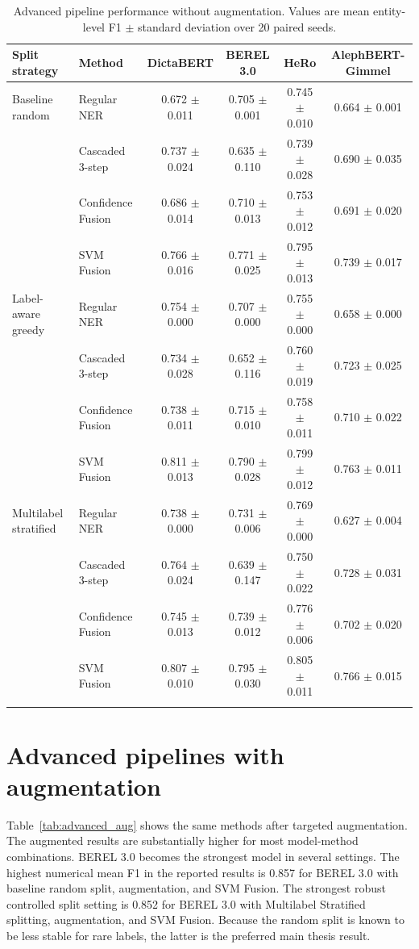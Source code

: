 \documentclass[12pt,a4paper]{report}
\begin{document}
\begin{landscape}
\begin{table}[htbp]
\centering
\scriptsize
\caption{Advanced pipeline performance without augmentation. Values are mean entity-level F1 $\pm$ standard deviation over 20 paired seeds.}
\label{tab:advanced_nonaug}
\begin{tabular}{llcccc}
\toprule
Split strategy & Method & DictaBERT & BEREL 3.0 & HeRo & AlephBERT-Gimmel \\
\midrule
Baseline random & Regular NER & 0.672 $\pm$ 0.011 & 0.705 $\pm$ 0.001 & 0.745 $\pm$ 0.010 & 0.664 $\pm$ 0.001 \\
 & Cascaded 3-step & 0.737 $\pm$ 0.024 & 0.635 $\pm$ 0.110 & 0.739 $\pm$ 0.028 & 0.690 $\pm$ 0.035 \\
 & Confidence Fusion & 0.686 $\pm$ 0.014 & 0.710 $\pm$ 0.013 & 0.753 $\pm$ 0.012 & 0.691 $\pm$ 0.020 \\
 & SVM Fusion & 0.766 $\pm$ 0.016 & 0.771 $\pm$ 0.025 & 0.795 $\pm$ 0.013 & 0.739 $\pm$ 0.017 \\
\addlinespace[2pt]
Label-aware greedy & Regular NER & 0.754 $\pm$ 0.000 & 0.707 $\pm$ 0.000 & 0.755 $\pm$ 0.000 & 0.658 $\pm$ 0.000 \\
 & Cascaded 3-step & 0.734 $\pm$ 0.028 & 0.652 $\pm$ 0.116 & 0.760 $\pm$ 0.019 & 0.723 $\pm$ 0.025 \\
 & Confidence Fusion & 0.738 $\pm$ 0.011 & 0.715 $\pm$ 0.010 & 0.758 $\pm$ 0.011 & 0.710 $\pm$ 0.022 \\
 & SVM Fusion & 0.811 $\pm$ 0.013 & 0.790 $\pm$ 0.028 & 0.799 $\pm$ 0.012 & 0.763 $\pm$ 0.011 \\
\addlinespace[2pt]
Multilabel stratified & Regular NER & 0.738 $\pm$ 0.000 & 0.731 $\pm$ 0.006 & 0.769 $\pm$ 0.000 & 0.627 $\pm$ 0.004 \\
 & Cascaded 3-step & 0.764 $\pm$ 0.024 & 0.639 $\pm$ 0.147 & 0.750 $\pm$ 0.022 & 0.728 $\pm$ 0.031 \\
 & Confidence Fusion & 0.745 $\pm$ 0.013 & 0.739 $\pm$ 0.012 & 0.776 $\pm$ 0.006 & 0.702 $\pm$ 0.020 \\
 & SVM Fusion & 0.807 $\pm$ 0.010 & 0.795 $\pm$ 0.030 & 0.805 $\pm$ 0.011 & 0.766 $\pm$ 0.015 \\
\addlinespace[2pt]
\bottomrule
\end{tabular}
\end{table}
\end{landscape}

\section{Advanced pipelines with augmentation}
Table~\ref{tab:advanced_aug} shows the same methods after targeted augmentation. The augmented results are substantially higher for most model-method combinations. BEREL 3.0 becomes the strongest model in several settings. The highest numerical mean F1 in the reported results is 0.857 for BEREL 3.0 with baseline random split, augmentation, and SVM Fusion. The strongest robust controlled split setting is 0.852 for BEREL 3.0 with Multilabel Stratified splitting, augmentation, and SVM Fusion. Because the random split is known to be less stable for rare labels, the latter is the preferred main thesis result.
\end{document}

